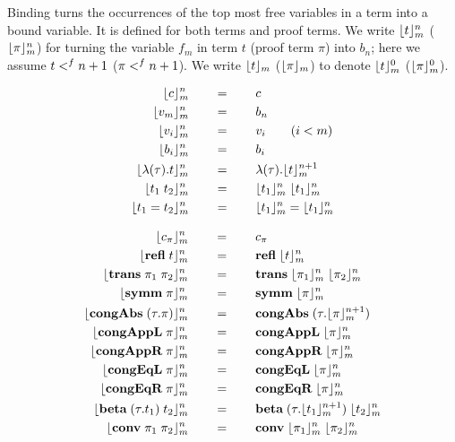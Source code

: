 \documentclass[10pt]{article}
\begin{document}
\begin{mydef}[Binding]\label{def:stlcd-binding}
Binding turns the occurrences of the top most free variables in a term
into a bound variable. It is defined for both terms and proof
terms. We write $\lfloor t\rfloor^{n}_{m}$ ($\lfloor\pi\rfloor^{n}_{m}$) for
turning the variable $f_m$ in term $t$ (proof term $\pi$) into $b_n$;
here we assume $t <^{f} n+1$ ($\pi <^{f} n+1$). We write
$\lfloor t\rfloor_{m}$ ($\lfloor\pi\rfloor_{m}$) to denote $\lfloor t\rfloor^{0}_{m}$
($\lfloor\pi\rfloor^{0}_{m}$).

\begin{align*}
  \lfloor c\rfloor^{n}_{m}   & \qquad = \qquad c\\
  \lfloor v_m\rfloor^{n}_{m} & \qquad = \qquad b_n\\
  \lfloor v_i\rfloor^{n}_{m} & \qquad = \qquad v_i  \qquad (i < m)\\
  \lfloor b_i\rfloor^{n}_{m} & \qquad = \qquad b_i\\
  \lfloor\lambda{(\tau)}.{t}\rfloor^{n}_{m} & \qquad = \qquad 
    \lambda{(\tau)}.{\lfloor t\rfloor^{n+1}_{m}}\\
  \lfloor t_1\; t_2\rfloor^{n}_{m} & \qquad = \qquad
    \lfloor t_1\rfloor^{n}_{m}\; \lfloor t_1\rfloor^{n}_{m}\\
  \lfloor t_1 = t_2\rfloor^{n}_{m} & \qquad = \qquad
    \lfloor t_1\rfloor^{n}_{m} = \lfloor t_1\rfloor^{n}_{m}
\end{align*}


\begin{align*}
  \lfloor c_\pi\rfloor^{n}_{m}     & \qquad = \qquad c_\pi\\
  \lfloor\mbox{\bf refl}\; t\rfloor^{n}_{m} & \qquad = \qquad \mbox{\bf refl}\;\lfloor t\rfloor^{n}_{m}\\
  \lfloor\mbox{\bf trans}\;\pi_1\; \pi_2\rfloor^{n}_{m} & \qquad = \qquad 
    \mbox{\bf trans}\;\lfloor\pi_1\rfloor^{n}_{m}\; \lfloor\pi_2\rfloor^{n}_{m}\\
  \lfloor\mbox{\bf symm}\; \pi\rfloor^{n}_{m} & \qquad = \qquad 
    \mbox{\bf symm}\; \lfloor\pi\rfloor^{n}_{m}\\
  \lfloor\mbox{\bf congAbs}\;(\tau.\pi)\rfloor^{n}_{m} & \qquad = \qquad 
    \mbox{\bf congAbs}\;(\tau.\lfloor\pi\rfloor^{n+1}_{m})\\
  \lfloor\mbox{\bf congAppL}\;\pi\rfloor^{n}_{m} & \qquad = \qquad 
    \mbox{\bf congAppL}\;\lfloor\pi\rfloor^{n}_{m}\\
  \lfloor\mbox{\bf congAppR}\;\pi\rfloor^{n}_{m} & \qquad = \qquad 
    \mbox{\bf congAppR}\;\lfloor\pi\rfloor^{n}_{m}\\
  \lfloor\mbox{\bf congEqL}\;\pi\rfloor^{n}_{m} & \qquad = \qquad 
    \mbox{\bf congEqL}\;\lfloor\pi\rfloor^{n}_{m}\\
  \lfloor\mbox{\bf congEqR}\;\pi\rfloor^{n}_{m} & \qquad = \qquad 
    \mbox{\bf congEqR}\;\lfloor\pi\rfloor^{n}_{m}\\
  \lfloor\mbox{\bf beta}\;(\tau.t_1)\; t_2\rfloor^{n}_{m} & \qquad = \qquad 
    \mbox{\bf beta}\;(\tau.\lfloor t_1\rfloor^{n+1}_{m})\; \lfloor t_2\rfloor^{n}_{m}\\
  \lfloor\mbox{\bf conv}\; \pi_1\; \pi_2\rfloor^{n}_{m} & \qquad = \qquad
    \mbox{\bf conv}\; \lfloor\pi_1\rfloor^{n}_{m}\; \lfloor\pi_2\rfloor^{n}_{m}
\end{align*}
  
\end{mydef}
\end{document}

